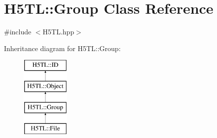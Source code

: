 \hypertarget{class_h5_t_l_1_1_group}{\section{H5\-T\-L\-:\-:Group Class Reference}
\label{class_h5_t_l_1_1_group}
}


{\ttfamily \#include $<$H5\-T\-L.\-hpp$>$}

Inheritance diagram for H5\-T\-L\-:\-:Group\-:\begin{figure}[H]
\begin{center}
\leavevmode
\includegraphics[height=4.000000cm]{class_h5_t_l_1_1_group}
\end{center}
\end{figure}

